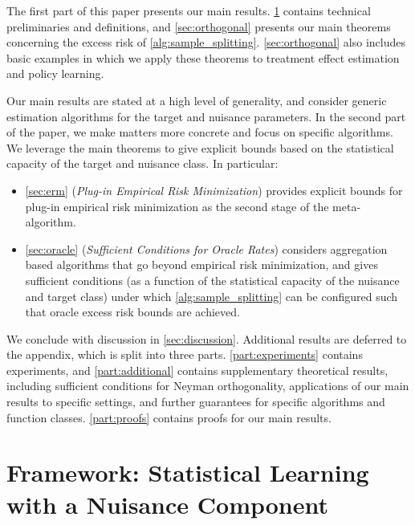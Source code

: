 \documentclass[11pt]{article} %
\newcommand{\pref}[1]{\cref{#1}}
\theoremstyle{theorem}  %
\theoremstyle{plain}
\newenvironment{revone}{\color{black}}{\ignorespacesafterend}
\begin{document}
\begin{revone}
The first part of this paper presents our main results. \pref{sec:setup} contains technical preliminaries and definitions, and \pref{sec:orthogonal} presents our main theorems concerning the excess risk of \pref{alg:sample_splitting}. \pref{sec:orthogonal} also includes basic examples in which we apply these theorems to treatment effect estimation and policy learning.%

Our main results are stated at a high level of generality, and consider generic estimation algorithms for the target and nuisance parameters. In the second part of the paper, we make matters more concrete and focus on specific algorithms.  We leverage the main theorems to give explicit bounds based on the statistical capacity of the target and nuisance class. In particular:
\begin{itemize}
\item \pref{sec:erm} (\emph{Plug-in Empirical Risk Minimization}) provides explicit bounds for plug-in empirical risk minimization as the second stage of the meta-algorithm.
\item \pref{sec:oracle} (\emph{Sufficient Conditions for Oracle Rates}) considers aggregation based algorithms that go beyond empirical risk minimization, and gives sufficient conditions (as a function of the statistical capacity of the nuisance and target class) under which \pref{alg:sample_splitting} can be configured such that oracle excess risk bounds are achieved. 
\end{itemize}
We conclude with discussion in \pref{sec:discussion}. Additional results are deferred to the appendix, which is split into three parts. \pref{part:experiments} contains experiments, and \pref{part:additional} contains supplementary theoretical results, including sufficient conditions for Neyman orthogonality, applications of our main results to specific settings, and further guarantees for specific algorithms and function classes. \pref{part:proofs} contains proofs for our main results.
\end{revone}

%
%


%
%

%

%
%
%
%
 
\section{Framework: Statistical Learning with a Nuisance Component}
\label{sec:setup}
%
%
\end{document}
